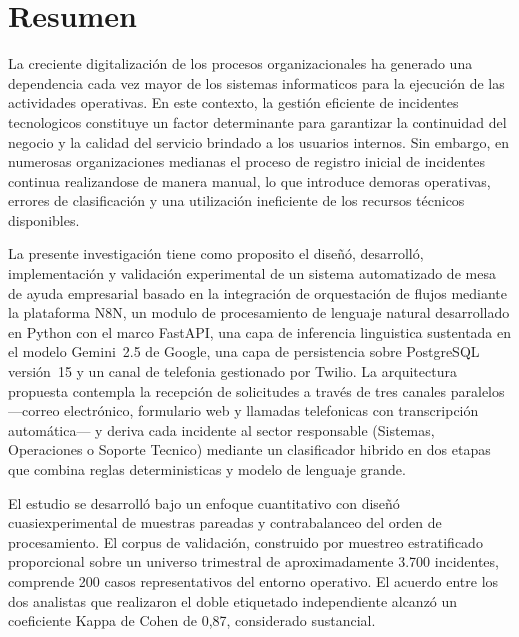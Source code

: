 \newpage
\section*{Resumen}

La creciente digitalización de los procesos organizacionales ha generado una dependencia cada vez mayor de los sistemas informaticos para la ejecución de las actividades operativas. En este contexto, la gestión eficiente de incidentes tecnologicos constituye un factor determinante para garantizar la continuidad del negocio y la calidad del servicio brindado a los usuarios internos. Sin embargo, en numerosas organizaciones medianas el proceso de registro inicial de incidentes continua realizandose de manera manual, lo que introduce demoras operativas, errores de clasificación y una utilización ineficiente de los recursos técnicos disponibles.

La presente investigación tiene como proposito el diseñó, desarrolló, implementación y validación experimental de un sistema automatizado de mesa de ayuda empresarial basado en la integración de orquestación de flujos mediante la plataforma N8N, un modulo de procesamiento de lenguaje natural desarrollado en Python con el marco FastAPI, una capa de inferencia linguistica sustentada en el modelo Gemini~2.5 de Google, una capa de persistencia sobre PostgreSQL versión~15 y un canal de telefonia gestionado por Twilio. La arquitectura propuesta contempla la recepción de solicitudes a través de tres canales paralelos ---correo electrónico, formulario web y llamadas telefonicas con transcripción automática--- y deriva cada incidente al sector responsable (Sistemas, Operaciones o Soporte Tecnico) mediante un clasificador hibrido en dos etapas que combina reglas deterministicas y modelo de lenguaje grande.

El estudio se desarrolló bajo un enfoque cuantitativo con diseñó cuasiexperimental de muestras pareadas y contrabalanceo del orden de procesamiento. El corpus de validación, construido por muestreo estratificado proporcional sobre un universo trimestral de aproximadamente 3.700 incidentes, comprende 200 casos representativos del entorno operativo. El acuerdo entre los dos analistas que realizaron el doble etiquetado independiente alcanzó un coeficiente Kappa de Cohen de 0,87, considerado sustancial.


